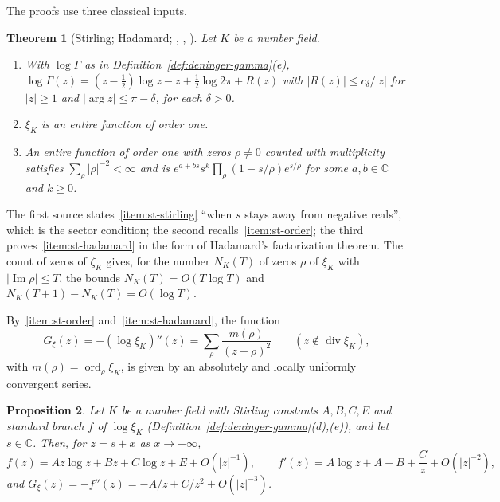 \documentclass[11pt]{amsart}
\theoremstyle{plain}
\newtheorem{theorem}{Theorem}[section]
\newtheorem{proposition}[theorem]{Proposition}
\theoremstyle{definition}
\theoremstyle{remark}
\numberwithin{equation}{section}
\newcommand{\C}{\mathbb{C}}
\DeclareMathOperator{\divisor}{div}
\DeclareMathOperator{\Ima}{Im}
\DeclareMathOperator{\ord}{ord}
\renewcommand{\Im}{\Ima}
\begin{document}
The proofs use three classical inputs.

\begin{theorem}[{Stirling; Hadamard;
\cite[Lemma~3.1, p.~24]{Hindry2010ZetaL},
\cite[p.~3]{HasanalizadeShenWong2021CountingZeros},
\cite[Theorem~1.4, p.~2, specialized to order one, and Lemma~4.10,
p.~11]{Dupuy2017Hadamard}}]
\label{thm:imp-stirling}
Let $K$ be a number field.
\begin{enumerate}[label=(\roman*)]
\item\label{item:st-stirling} With $\log\Gamma$ as in
  Definition~\ref{def:deninger-gamma}(e),
  $\log\Gamma(z)=(z-\tfrac12)\log z-z+\tfrac12\log2\pi+R(z)$ with
  $|R(z)|\le c_\delta/|z|$ for $|z|\ge1$ and $|\arg z|\le\pi-\delta$,
  for each $\delta>0$.
\item\label{item:st-order} $\xi_K$ is an entire function of order one.
\item\label{item:st-hadamard} An entire function of order one with
  zeros $\rho\ne0$ counted with multiplicity satisfies
  $\sum_\rho|\rho|^{-2}<\infty$ and is
  $e^{a+bs}s^{k}\prod_\rho(1-s/\rho)e^{s/\rho}$ for some $a,b\in\C$
  and $k\ge0$.
\end{enumerate}
\end{theorem}

The first source states~\ref{item:st-stirling} ``when $s$ stays away
from negative reals'', which is the sector condition; the second
recalls~\ref{item:st-order}; the third proves~\ref{item:st-hadamard}
in the form of Hadamard's factorization theorem. The count of zeros of
$\zeta_K$ \cite[Theorem~1.1, p.~2]{HasanalizadeShenWong2021CountingZeros}
gives, for the number $N_K(T)$ of zeros $\rho$ of $\xi_K$ with
$|\Im\rho|\le T$, the bounds $N_K(T)=O(T\log T)$ and
$N_K(T+1)-N_K(T)=O(\log T)$.

By~\ref{item:st-order} and~\ref{item:st-hadamard}, the function
\begin{equation}\label{eq:G-K}
G_{\xi}(z)=-(\log\xi_K)''(z)=\sum_\rho\frac{m(\rho)}{(z-\rho)^2}
\qquad(z\notin\divisor\xi_K),
\end{equation}
with $m(\rho)=\ord_\rho\xi_K$, is given by an absolutely and locally
uniformly convergent series.

\begin{proposition}\label{prop:xiK-asymp}
Let $K$ be a number field with Stirling constants $A,B,C,E$ and standard
branch $f$ of $\log\xi_K$ (Definition~\ref{def:deninger-gamma}(d),(e)),
and let $s\in\C$. Then, for $z=s+x$ as $x\to+\infty$,
\[
f(z)=Az\log z+Bz+C\log z+E+O(|z|^{-1}),\qquad
f'(z)=A\log z+A+B+\frac Cz+O(|z|^{-2}),
\]
and $G_\xi(z)=-f''(z)=-A/z+C/z^2+O(|z|^{-3})$.
\end{proposition}
\end{document}
